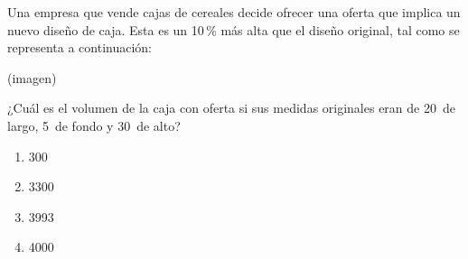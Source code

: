 \begin{problem}
    Una empresa que vende cajas de cereales decide ofrecer una oferta que implica un nuevo diseño de caja. Esta es un 10\,\% más alta que el diseño original, tal como se representa a continuación:

    \begin{center}
    (imagen)
    \end{center}

    ¿Cuál es el volumen de la caja con oferta si sus medidas originales eran de 20\, de largo, 5\, de fondo y 30\, de alto?

    \begin{enumerate}[label=\Alph*.]
        \item 300\,
        \item 3300\,
        \item 3993\,
        \item 4000\,
    \end{enumerate}
\end{problem}
